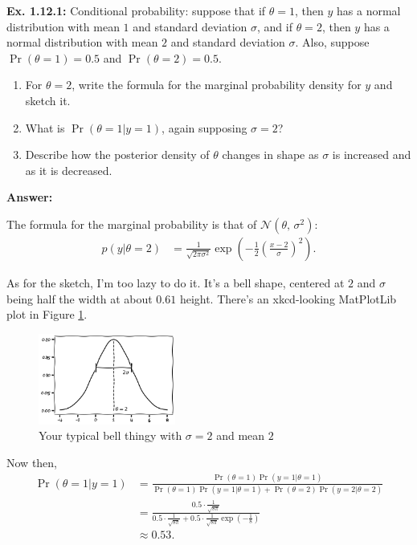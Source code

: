 \documentclass{article}
\newcommand\oname\operatorname
\begin{document}

\textbf{Ex. 1.12.1: }Conditional probability: suppose that if $\theta=1$, then $y$ has a normal distribution with mean $1$ and standard deviation $\sigma$, and if $\theta=2$, then $y$ has a normal distribution with mean $2$ and standard deviation $\sigma$. Also, suppose $\oname{Pr}(\theta=1)=0.5$ and $\oname{Pr}(\theta=2)=0.5$.

\begin{enumerate}[label=\alph*]
	\item For $\theta=2$, write the formula for the marginal probability density for $y$ and sketch it.
	\item What is $\oname{Pr}(\theta=1|y=1)$, again supposing $\sigma=2$?
	\item Describe how the posterior density of $\theta$ changes in shape as $\sigma$ is increased and as it is decreased.
\end{enumerate}

\textbf{Answer:}

The formula for the marginal probability is that of $\mathcal N(\theta,\,\sigma^2)$:
\begin{align*}
	p(y|\theta=2)&=\frac1{\sqrt{2\pi\sigma^2}}\exp\left(-\frac12\left(\frac{x-2}\sigma\right)^2\right).
\end{align*}

As for the sketch, I'm too lazy to do it. It's a bell shape, centered at $2$ and $\sigma$ being half the width at about $0.61$ height. There's an xkcd-looking MatPlotLib plot in Figure \ref{fig:1.12.1}.
\begin{figure}[h]
	\centering
	\includegraphics[width=0.4\textwidth]{Numerical/1.12.1}
	\caption{Your typical bell thingy with $\sigma=2$ and mean $2$}
	\label{fig:1.12.1}
\end{figure}

Now then,
\begin{align*}
	\oname{Pr}(\theta=1|y=1)&=\frac{\oname{Pr}(\theta=1)\oname{Pr}(y=1|\theta=1)}{\oname{Pr}(\theta=1)\oname{Pr}(y=1|\theta=1)+\oname{Pr}(\theta=2)\oname{Pr}(y=2|\theta=2)}\\
	&=\frac{0.5\cdot\frac1{\sqrt{8\pi}}}{0.5\cdot\frac1{\sqrt{8\pi}}+0.5\cdot\frac1{\sqrt{8\pi}}\exp\left(-\frac18\right)}\\
	&\approx0.53.
\end{align*}
\end{document}
